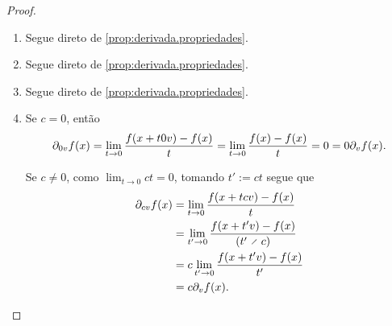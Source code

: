 \begin{proof}
	\begin{enumerate}
	\item Segue direto de \ref{prop:derivada.propriedades}.

	\item Segue direto de \ref{prop:derivada.propriedades}.

	\item Segue direto de \ref{prop:derivada.propriedades}.

	\item Se $c=0$, então
		\begin{equation*}
		\partial_{0v} f(x) = \lim_{t \to 0} \frac{f(x+t0v) - f(x)}{t} = \lim_{t \to 0} \frac{f(x) - f(x)}{t} = 0 = 0\partial_{v} f(x).
		\end{equation*}

	Se $c \neq 0$, como $\lim_{t \to 0} ct = 0$, tomando $t' := ct$ segue que
		\begin{align*}
		\dir{cv} f(x) &= \lim_{t \to 0} \frac{f(x+tcv) - f(x)}{t} \\
			&= \lim_{t' \to 0} \frac{f(x+t'v) - f(x)}{(t' \div c)} \\
			&= c\lim_{t' \to 0} \frac{f(x+t'v) - f(x)}{t'} \\
			&= c\dir{v} f(x).
		\qedhere
		\end{align*}
	\end{enumerate}
\end{proof}



